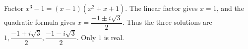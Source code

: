 Factor $x^3-1=(x-1)(x^2+x+1)$. The linear factor gives $x=1$, and the quadratic formula gives $x=\dfrac{-1\pm i\sqrt 3}{2}$. Thus the three solutions are $\boxed{1,\dfrac{-1+i\sqrt 3}{2},\dfrac{-1-i\sqrt 3}{2}}$. Only $1$ is real.
